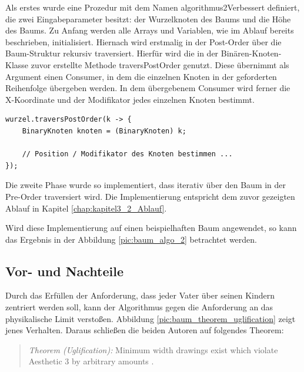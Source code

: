 Als erstes wurde eine Prozedur mit dem Namen \glqq algorithmus2Verbessert\grqq{} 
definiert, die zwei Eingabeparameter besitzt: der Wurzelknoten des Baums 
und die Höhe des Baums. Zu Anfang werden alle Arrays und Variablen, wie im Ablauf 
bereits beschrieben, initialisiert. Hiernach wird erstmalig in der Post-Order über 
die Baum-Struktur rekursiv traversiert. Hierfür wird die in der Binären-Knoten-Klasse 
zuvor erstellte Methode \glqq traversPostOrder\grqq{} genutzt. Diese übernimmt als Argument einen Consumer, 
in dem die einzelnen Knoten in der geforderten Reihenfolge übergeben werden. In dem übergebenem Consumer 
wird ferner die X-Koordinate und der Modifikator jedes einzelnen Knoten bestimmt.

\begin{lstlisting}[caption=Vereinfachte Implementierung der Phase 1, label=code:algo2_phase1]
wurzel.traversPostOrder(k -> {
    BinaryKnoten knoten = (BinaryKnoten) k;

    // Position / Modifikator des Knoten bestimmen ...
});
\end{lstlisting}

Die zweite Phase wurde so implementiert, dass iterativ über den Baum in der Pre-Order traversiert 
wird. Die Implementierung entspricht dem zuvor gezeigten Ablauf in Kapitel \ref{chap:kapitel3_2_Ablauf}. 

Wird diese Implementierung auf einen beispielhaften Baum angewendet, so kann das Ergebnis
in der Abbildung \ref{pic:baum_algo_2} betrachtet werden.

\subsection{Vor- und Nachteile}
Durch das Erfüllen der Anforderung, dass jeder Vater über seinen Kindern zentriert werden soll, kann der Algorithmus gegen
die Anforderung an das physikalische Limit verstoßen. 
Abbildung \ref{pic:baum_theorem_uglification} zeigt jenes Verhalten. Daraus schließen die beiden Autoren auf folgendes Theorem:

\begin{quotation}
	\textit{Theorem (Uglification):} Minimum width drawings exist which violate Aesthetic 3 by arbitrary amounts \cite[]{q1}.
\end{quotation}

